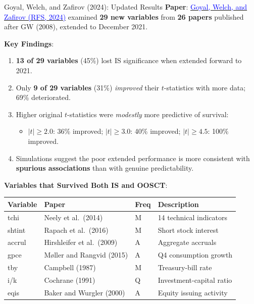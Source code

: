 \documentclass{beamer}
\begin{document}
\begin{frame}[allowframebreaks]{Goyal, Welch, and Zafirov (2024): Updated Results}
    \textbf{Paper}: \href{https://doi.org/10.1093/rfs/hhae044}{\textcolor{blue}{Goyal, Welch, and Zafirov (RFS, 2024)}} examined \textbf{29 new variables} from \textbf{26 papers} published after GW (2008), extended to December 2021.

    \vspace{0.3cm}
    \textbf{Key Findings}:
    \begin{enumerate}
        \item \textbf{13 of 29 variables} (45\%) lost IS significance when extended forward to 2021.
        \item Only \textbf{9 of 29 variables} (31\%) \textit{improved} their $t$-statistics with more data; 69\% deteriorated.
        \item Higher original $t$-statistics were \textit{modestly} more predictive of survival:
        \begin{itemize}
            \item $|t| \geq 2.0$: 36\% improved; $|t| \geq 3.0$: 40\% improved; $|t| \geq 4.5$: 100\% improved.
        \end{itemize}
        \item Simulations suggest the poor extended performance is more consistent with \textbf{spurious associations} than with genuine predictability.
    \end{enumerate}

    \framebreak

    \textbf{Variables that Survived Both IS and OOSCT}:
    \begin{table}[h]
    \centering
    \footnotesize
    \begin{tabular}{llll}
    \hline
    \textbf{Variable} & \textbf{Paper} & \textbf{Freq} & \textbf{Description} \\
    \hline
    tchi & Neely et al.\ (2014) & M & 14 technical indicators \\
    shtint & Rapach et al.\ (2016) & M & Short stock interest \\
    accrul & Hirshleifer et al.\ (2009) & A & Aggregate accruals \\
    gpce & M{\o}ller and Rangvid (2015) & A & Q4 consumption growth \\
    \hline
    tby & Campbell (1987) & M & Treasury-bill rate \\
    i/k & Cochrane (1991) & Q & Investment-capital ratio \\
    eqis & Baker and Wurgler (2000) & A & Equity issuing activity \\
    \hline
    \end{tabular}
    \end{table}


\end{frame}
\end{document}
